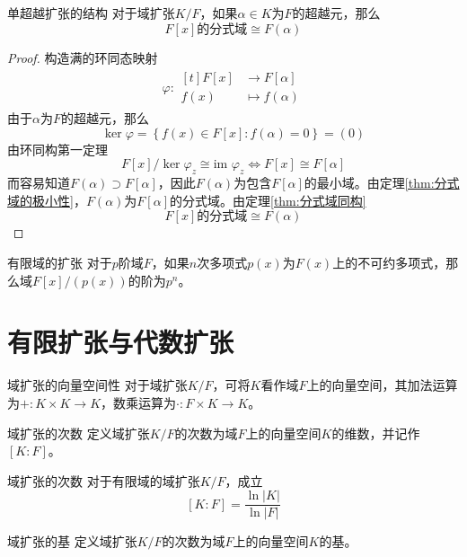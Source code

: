 \documentclass[lang = cn, scheme = chinese, thmcnt = section]{elegantbook}
\begin{document}
\begin{theorem}{单超越扩张的结构}
	对于域扩张$K/F$，如果$\alpha\in K$为$F$的超越元，那么
	$$
	F[x]\text{的分式域}\cong F(\alpha)
	$$
\end{theorem}

\begin{proof}
	构造满的环同态映射
	\begin{align*}
		\varphi:\begin{aligned}[t]
			F[x]&\longrightarrow F[\alpha]\\
			f(x)&\longmapsto f(\alpha)
		\end{aligned}
	\end{align*}
	由于$\alpha$为$F$的超越元，那么
	$$
	\ker\varphi=\left\{ f(x)\in F[x]:f(\alpha)=0 \right\}=(0)
	$$
	由环同构第一定理
	$$
	F[x]/\ker\varphi_z\cong\text{im }\varphi_z\iff 
	F[x]\cong  F[\alpha]
	$$
	而容易知道$F(\alpha)\supset F[\alpha]$，因此$F(\alpha)$为包含$F[\alpha]$的最小域。由定理\ref{thm:分式域的极小性}，$F(\alpha)$为$F[\alpha]$的分式域。由定理\ref{thm:分式域同构}
	$$
	F[x]\text{的分式域}\cong F(\alpha)
	$$
\end{proof}

\begin{corollary}{有限域的扩张}
	对于$p$阶域$F$，如果$n$次多项式$p(x)$为$F(x)$上的不可约多项式，那么域$F[x]/(p(x))$的阶为$p^n$。
\end{corollary}

\section{有限扩张与代数扩张}

\begin{definition}{域扩张的向量空间性}
	对于域扩张$K/F$，可将$K$看作域$F$上的向量空间，其加法运算为$+:K\times K\to K$，数乘运算为$\cdot:F\times K\to K$。
\end{definition}

\begin{definition}{域扩张的次数}
	定义域扩张$K/F$的次数为域$F$上的向量空间$K$的维数，并记作$[K:F]$。
\end{definition}

\begin{theorem}{}{域扩张的次数}
	对于有限域的域扩张$K/F$，成立
	$$
	[K:F]=\frac{\ln|K|}{\ln|F|}
	$$
\end{theorem}

\begin{definition}{域扩张的基}
	定义域扩张$K/F$的次数为域$F$上的向量空间$K$的基。
\end{definition}
\end{document}
